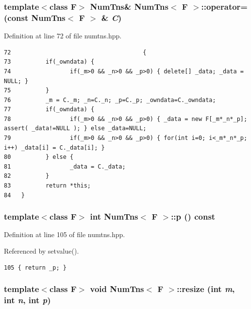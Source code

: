 \subsubsection{\setlength{\rightskip}{0pt plus 5cm}template$<$class F$>$ {\bf Num\-Tns}\& {\bf Num\-Tns}$<$ F $>$::operator= (const {\bf Num\-Tns}$<$ F $>$ \& {\em C})\hspace{0.3cm}{\tt  [inline]}}\label{classNumTns_58e18b6d855be7b948bd8e49faeae5e2_58e18b6d855be7b948bd8e49faeae5e2}




Definition at line 72 of file numtns.hpp.

\footnotesize\begin{verbatim}72                                      {
73          if(_owndata) { 
74                 if(_m>0 && _n>0 && _p>0) { delete[] _data; _data = NULL; } 
75          }
76          _m = C._m; _n=C._n; _p=C._p; _owndata=C._owndata;
77          if(_owndata) {
78                 if(_m>0 && _n>0 && _p>0) { _data = new F[_m*_n*_p]; assert( _data!=NULL ); } else _data=NULL;
79                 if(_m>0 && _n>0 && _p>0) { for(int i=0; i<_m*_n*_p; i++) _data[i] = C._data[i]; }
80          } else {
81                 _data = C._data;
82          }
83          return *this;
84   }
\end{verbatim}\normalsize 


\subsubsection{\setlength{\rightskip}{0pt plus 5cm}template$<$class F$>$ int {\bf Num\-Tns}$<$ F $>$::p () const\hspace{0.3cm}{\tt  [inline]}}\label{classNumTns_7447c13ce6f46f262a0d6d072991620b_7447c13ce6f46f262a0d6d072991620b}




Definition at line 105 of file numtns.hpp.

Referenced by setvalue().

\footnotesize\begin{verbatim}105 { return _p; }
\end{verbatim}\normalsize 


\subsubsection{\setlength{\rightskip}{0pt plus 5cm}template$<$class F$>$ void {\bf Num\-Tns}$<$ F $>$::resize (int {\em m}, int {\em n}, int {\em p})\hspace{0.3cm}{\tt  [inline]}}\label{classNumTns_de332141c031fca49971f057c72a9b17_de332141c031fca49971f057c72a9b17}




